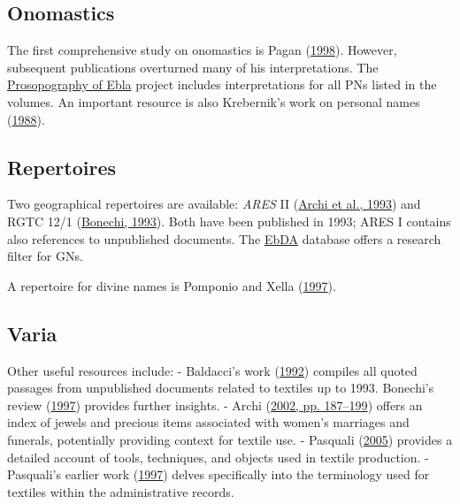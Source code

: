 \documentclass[
]{book}
\begin{document}
\hypertarget{onomastics}{%
\subsection{Onomastics}\label{onomastics}}

The first comprehensive study on onomastics is Pagan (\protect\hyperlink{ref-Pagan1998}{1998}). However, subsequent publications overturned many of his interpretations. The \href{https://www.sagas.unifi.it/p359.html}{Prosopography of Ebla} project includes interpretations for all PNs listed in the volumes. An important resource is also Krebernik's work on personal names (\protect\hyperlink{ref-Krebernik1988a}{1988}).

\hypertarget{repertoires}{%
\subsection{Repertoires}\label{repertoires}}

Two geographical repertoires are available: \emph{ARES} II (\protect\hyperlink{ref-ArchiEtAl1993}{Archi et al., 1993}) and RGTC 12/1 (\protect\hyperlink{ref-Bonechi1993a}{Bonechi, 1993}). Both have been published in 1993; ARES I contains also references to unpublished documents. The \href{http://ebda.cnr.it/}{EbDA} database offers a research filter for GNs.

A repertoire for divine names is Pomponio and Xella (\protect\hyperlink{ref-PomponioXella1997}{1997}).

\hypertarget{varia}{%
\subsection{Varia}\label{varia}}

Other useful resources include:
- Baldacci's work (\protect\hyperlink{ref-Baldacci1992}{1992}) compiles all quoted passages from unpublished documents related to textiles up to 1993. Bonechi's review (\protect\hyperlink{ref-Bonechi1997e}{1997}) provides further insights.
- Archi (\protect\hyperlink{ref-Archi2002a}{2002, pp. 187--199}) offers an index of jewels and precious items associated with women's marriages and funerals, potentially providing context for textile use.
- Pasquali (\protect\hyperlink{ref-Pasquali2005a}{2005}) provides a detailed account of tools, techniques, and objects used in textile production.
- Pasquali's earlier work (\protect\hyperlink{ref-Pasquali1997b}{1997}) delves specifically into the terminology used for textiles within the administrative records.
\end{document}
